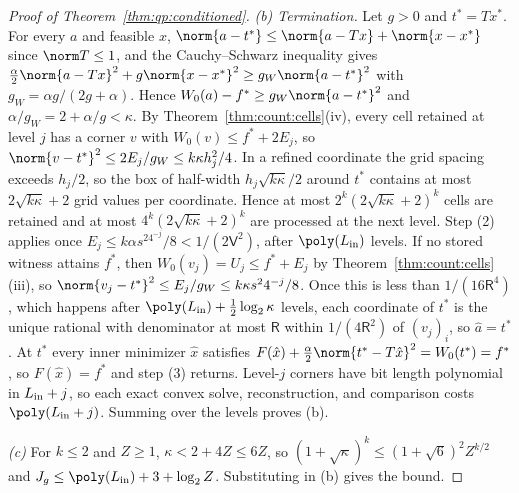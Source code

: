 \begin{proof}[Proof of Theorem~\ref{thm:qp:conditioned}]
\emph{(b) Termination.} Let $g>0$ and $t^*=Tx^*$. For every $a$ and feasible
$x$, $\norm{a-t^*}\le\norm{a-Tx}+\norm{x-x^*}$ since $\norm T\le1$, and the
Cauchy--Schwarz inequality gives
$\frac\alpha2\norm{a-Tx}^2+g\norm{x-x^*}^2\ge g_W\norm{a-t^*}^2$ with
$g_W=\alpha g/(2g+\alpha)$. Hence $W_0(a)-f^*\ge g_W\norm{a-t^*}^2$ and
$\alpha/g_W=2+\alpha/g<\kappa$. By Theorem~\ref{thm:count:cells}(iv), every
cell retained at level $j$ has a corner $v$ with $W_0(v)\le f^*+2E_j$, so
$\norm{v-t^*}^2\le2E_j/g_W\le k\kappa h_j^2/4$. In a refined coordinate the
grid spacing exceeds $h_j/2$, so the box of half-width $h_j\sqrt{k\kappa}/2$
around $t^*$ contains at most $2\sqrt{k\kappa}+2$ grid values per coordinate.
Hence at most $2^k(2\sqrt{k\kappa}+2)^k$ cells are retained and at most
$4^k(2\sqrt{k\kappa}+2)^k$ are processed at the next level. Step (2) applies
once $E_j\le k\alpha s^24^{-j}/8<1/(2\mathsf V^2)$, after $\poly(L_{\rm in})$
levels. If no stored witness attains $f^*$, then
$W_0(v_j)=U_j\le f^*+E_j$ by Theorem~\ref{thm:count:cells}(iii), so
$\norm{v_j-t^*}^2\le E_j/g_W\le k\kappa s^24^{-j}/8$. Once this is less than
$1/(16\mathsf R^4)$, which happens after $\poly(L_{\rm in})+\frac12\log_2\kappa$
levels, each coordinate of $t^*$ is the unique rational with denominator at
most $\mathsf R$ within $1/(4\mathsf R^2)$ of $(v_j)_i$, so $\hat a=t^*$. At
$t^*$ every inner minimizer $\hat x$ satisfies
$F(\hat x)+\frac\alpha2\norm{t^*-T\hat x}^2=W_0(t^*)=f^*$, so $F(\hat x)=f^*$ and
step (3) returns. Level-$j$ corners have bit length polynomial in
$L_{\rm in}+j$, so each exact convex solve, reconstruction, and comparison
costs $\poly(L_{\rm in}+j)$. Summing over the levels proves (b).

\emph{(c)} For $k\le2$ and $Z\ge1$, $\kappa<2+4Z\le6Z$, so
$(1+\sqrt\kappa)^k\le(1+\sqrt6)^2Z^{k/2}$ and
$J_g\le\poly(L_{\rm in})+3+\log_2Z$. Substituting in (b) gives the bound.
\end{proof}

